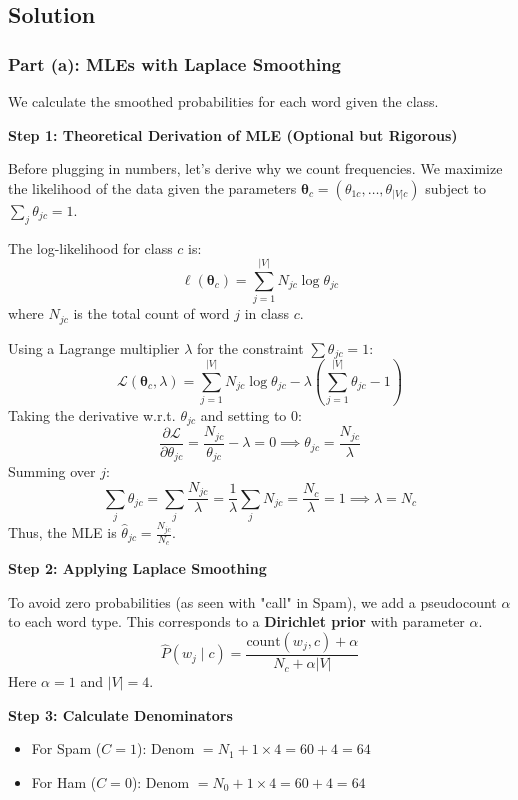 \documentclass[12pt]{article}
\begin{document}
\subsection{Solution}

\subsubsection{Part (a): MLEs with Laplace Smoothing}

\begin{solution}
We calculate the smoothed probabilities for each word given the class.

\textbf{Step 1: Theoretical Derivation of MLE (Optional but Rigorous)}

Before plugging in numbers, let's derive why we count frequencies.
We maximize the likelihood of the data given the parameters $\boldsymbol{\theta}_c = (\theta_{1c}, \dots, \theta_{|V|c})$ subject to $\sum_j \theta_{jc} = 1$.

The log-likelihood for class $c$ is:
\[
\ell(\boldsymbol{\theta}_c) = \sum_{j=1}^{|V|} N_{jc} \log \theta_{jc}
\]
where $N_{jc}$ is the total count of word $j$ in class $c$.

Using a Lagrange multiplier $\lambda$ for the constraint $\sum \theta_{jc} = 1$:
\[
\mathcal{L}(\boldsymbol{\theta}_c, \lambda) = \sum_{j=1}^{|V|} N_{jc} \log \theta_{jc} - \lambda \left( \sum_{j=1}^{|V|} \theta_{jc} - 1 \right)
\]
Taking the derivative w.r.t. $\theta_{jc}$ and setting to 0:
\[
\frac{\partial \mathcal{L}}{\partial \theta_{jc}} = \frac{N_{jc}}{\theta_{jc}} - \lambda = 0 \implies \theta_{jc} = \frac{N_{jc}}{\lambda}
\]
Summing over $j$:
\[
\sum_j \theta_{jc} = \sum_j \frac{N_{jc}}{\lambda} = \frac{1}{\lambda} \sum_j N_{jc} = \frac{N_c}{\lambda} = 1 \implies \lambda = N_c
\]
Thus, the MLE is $\hat{\theta}_{jc} = \frac{N_{jc}}{N_c}$.

\textbf{Step 2: Applying Laplace Smoothing}

To avoid zero probabilities (as seen with "call" in Spam), we add a pseudocount $\alpha$ to each word type. This corresponds to a \textbf{Dirichlet prior} with parameter $\alpha$.
\[
\hat{P}(w_j \mid c) = \frac{\text{count}(w_j, c) + \alpha}{N_c + \alpha |V|}
\]
Here $\alpha = 1$ and $|V| = 4$.

\textbf{Step 3: Calculate Denominators}

\begin{itemize}
    \item For Spam ($C=1$): Denom $= N_1 + 1 \times 4 = 60 + 4 = 64$
    \item For Ham ($C=0$): Denom $= N_0 + 1 \times 4 = 60 + 4 = 64$
\end{itemize}


\end{solution}
\end{document}
